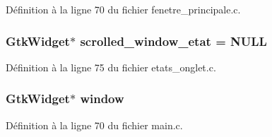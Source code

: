 Définition à la ligne 70 du fichier fenetre\_\-principale.c.

\subsubsection[{scrolled\_\-window\_\-etat}]{\setlength{\rightskip}{0pt plus 5cm}GtkWidget$\ast$ {\bf scrolled\_\-window\_\-etat} = NULL}\label{etats__onglet_8c_adb1790226edec7f94cf9ddebf2790c62}


Définition à la ligne 75 du fichier etats\_\-onglet.c.

\subsubsection[{window}]{\setlength{\rightskip}{0pt plus 5cm}GtkWidget$\ast$ {\bf window}}\label{etats__onglet_8c_a3d346c08cf2d67c388caabffb412b293}


Définition à la ligne 70 du fichier main.c.

